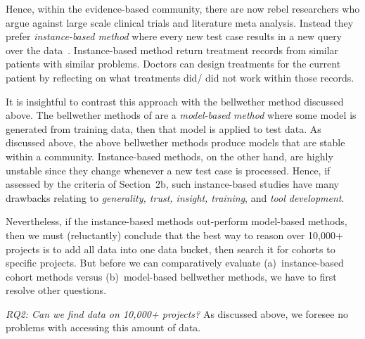 Hence,   within the evidence-based community,
there are now rebel researchers who argue against large scale clinical
trials and literature meta analysis. Instead they prefer
{\em instance-based method} where every new test case results in a new query over the data~\cite{gallego2015bringing}.
Instance-based method return treatment records from  similar patients with similar problems.
Doctors can design treatments for the current patient by reflecting on what treatments
did/ did not work within those records.

It is insightful to contrast this approach with the bellwether method discussed above.
The bellwether methods of  are a {\em model-based method} where some model
is generated from training data, then that model is applied to test data.
As discussed above, the above bellwether methods produce models that are stable within a community.
 Instance-based methods, on the other hand, are highly  unstable since they change whenever a new test case is processed. 
Hence, if assessed by the criteria of Section~2b, such instance-based  studies have many drawbacks 
relating to {\em generality, trust, insight, training}, and {\em tool development}. 

Nevertheless, if the instance-based
 methods out-perform   model-based methods, then we must (reluctantly) conclude that the best way to reason over 10,000+ projects is to add
all   data into one data bucket, then search it for cohorts to specific projects.
But before we can comparatively evaluate (a)~instance-based cohort methods versus 
(b)~model-based bellwether methods, we have to first resolve   other  
questions. 

 
{\em RQ2: Can we find data on 10,000+ projects?} As discussed
above, we foresee no problems with accessing this amount of data.

